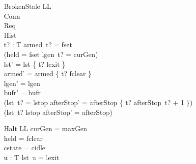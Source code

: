 \documentclass[a4paper,10pt,fleqn]{article}
\begin{document}
\begin{schema}{BrokenStale}
  \Delta LL \\
  \Xi Conn \\
  \Xi Req \\
  \Xi Hist \\
  t? : T
\where
  armed~t? = fset \\
  \lnot (held = fset \land lgen~t? = curGen) \\
  lst' = lst \oplus \{ t? \mapsto lexit \} \\
  armed' = armed \oplus \{ t? \mapsto fclear \} \\
  lgen' = lgen \\
  bufr' = bufr \\
  (lst~t? = lstop \implies
    afterStop' = afterStop \oplus \{ t? \mapsto afterStop~t? + 1 \}) \\
  (lst~t? \neq lstop \implies afterStop' = afterStop)
\end{schema}

\begin{schema}{Halt}
  \Xi LL
\where
  curGen = maxGen \\
  held = fclear \\
  cstate = cidle \\
  \forall u : T \spot lst~u = lexit
\end{schema}
\end{document}
